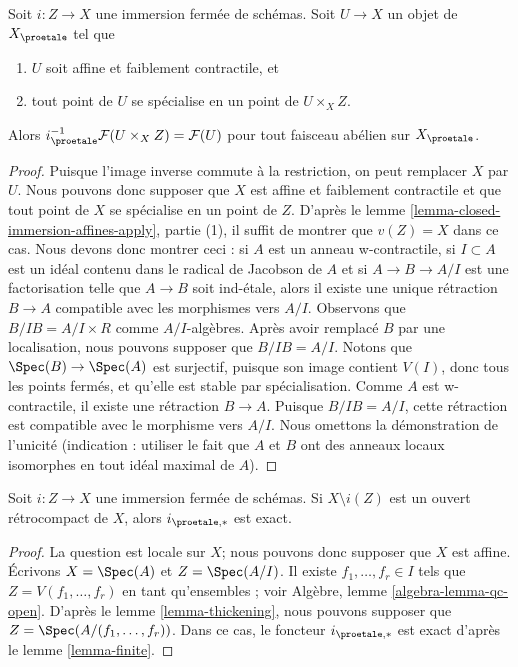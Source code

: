 \begin{lemma}
\label{lemma-compute-i-star}
Soit $i : Z \to X$ une immersion fermée de schémas.
Soit $U \to X$ un objet de $X_\proetale$ tel que
\begin{enumerate}
\item $U$ soit affine et faiblement contractile, et
\item tout point de $U$ se spécialise en un point de $U \times_X Z$.
\end{enumerate}
Alors $i_\proetale^{-1}\mathcal{F}(U \times_X Z) = \mathcal{F}(U)$
pour tout faisceau abélien sur $X_\proetale$.
\end{lemma}

\begin{proof}
Puisque l'image inverse commute à la restriction, on peut remplacer $X$ par $U$.
Nous pouvons donc supposer que $X$ est affine et faiblement contractile
et que tout point de $X$ se spécialise en un point de $Z$.
D'après le lemme \ref{lemma-closed-immersion-affines-apply}, partie (1),
il suffit de montrer que $v(Z) = X$ dans ce cas.
Nous devons donc montrer ceci : si $A$ est un anneau w-contractile, si $I \subset A$
est un idéal contenu dans le radical de Jacobson de $A$ et si $A \to B \to A/I$
est une factorisation telle que $A \to B$ soit ind-\'etale, alors il existe
une unique rétraction $B \to A$ compatible avec les morphismes vers $A/I$.
Observons que $B/IB = A/I \times R$ comme $A/I$-algèbres.
Après avoir remplacé $B$ par une localisation, nous pouvons supposer que $B/IB = A/I$.
Notons que $\Spec(B) \to \Spec(A)$ est surjectif, puisque son image
contient $V(I)$, donc tous les points fermés, et qu'elle est stable par
spécialisation. Comme $A$ est w-contractile, il existe une rétraction $B \to A$.
Puisque $B/IB = A/I$, cette rétraction est compatible avec le morphisme vers $A/I$.
Nous omettons la démonstration de l'unicité (indication : utiliser le fait que $A$ et $B$ ont
des anneaux locaux isomorphes en tout idéal maximal de $A$).
\end{proof}

\begin{lemma}
\label{lemma-closed-immersion-complement-retrocompact-exact}
Soit $i : Z \to X$ une immersion fermée de schémas.
Si $X \setminus i(Z)$ est un ouvert rétrocompact de $X$, alors
$i_{\proetale, *}$ est exact.
\end{lemma}

\begin{proof}
La question est locale sur $X$; nous pouvons donc supposer que $X$ est affine.
Écrivons $X = \Spec(A)$ et $Z = \Spec(A/I)$. Il existe
$f_1, \ldots, f_r \in I$ tels que $Z = V(f_1, \ldots, f_r)$
en tant qu'ensembles ; voir Algèbre, lemme \ref{algebra-lemma-qc-open}.
D'après le lemme \ref{lemma-thickening}, nous pouvons supposer que
$Z = \Spec(A/(f_1, \ldots, f_r))$. Dans ce cas,
le foncteur $i_{\proetale, *}$ est exact d'après le
lemme \ref{lemma-finite}.
\end{proof}





